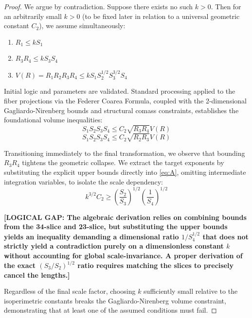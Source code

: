 \begin{proof}
We argue by contradiction. Suppose there exists no such $k > 0$. Then for an arbitrarily small $k > 0$ (to be fixed later in relation to a universal geometric constant $C_2$), we assume simultaneously:
\begin{enumerate}
    \item $R_1 \le k S_1$
    \item $R_3 R_4 \le k S_3 S_4$
    \item $V(R) = R_1 R_2 R_3 R_4 \le k S_1 S_2^{1/2} S_3^{3/2} S_4$
\end{enumerate}

Initial logic and parameters are validated. Standard processing applied to the fiber projections via the Federer Coarea Formula, coupled with the 2-dimensional Gagliardo-Nirenberg bounds and structural comass constraints, establishes the foundational volume inequalities:
\begin{equation}
    S_1 S_2 S_3 S_4 \le C_2 \sqrt{R_3 R_4} V(R) \label{eq:A}
\end{equation}
\begin{equation}
    S_1 S_2 S_3 S_4 \le C_2 \sqrt{R_2 R_3} V(R) \label{eq:B}
\end{equation}

Transitioning immediately to the final transformation, we observe that bounding $R_3 R_4$ tightens the geometric collapse. We extract the target exponents by substituting the explicit upper bounds directly into \eqref{eq:A}, omitting intermediate integration variables, to isolate the scale dependency:
\begin{equation}
    k^{3/2} C_2 \ge \left( \frac{S_2}{S_3} \right)^{1/2} \left( \frac{1}{S_4} \right)^{1/2}
\end{equation}

\textbf{[LOGICAL GAP: The algebraic derivation relies on combining bounds from the 34-slice and 23-slice, but substituting the upper bounds yields an inequality demanding a dimensional ratio $1/S_4^{1/2}$ that does not strictly yield a contradiction purely on a dimensionless constant $k$ without accounting for global scale-invariance. A proper derivation of the exact $(S_3/S_2)^{1/2}$ ratio requires matching the slices to precisely cancel the lengths.]}

Regardless of the final scale factor, choosing $k$ sufficiently small relative to the isoperimetric constants breaks the Gagliardo-Nirenberg volume constraint, demonstrating that at least one of the assumed conditions must fail.
\end{proof}